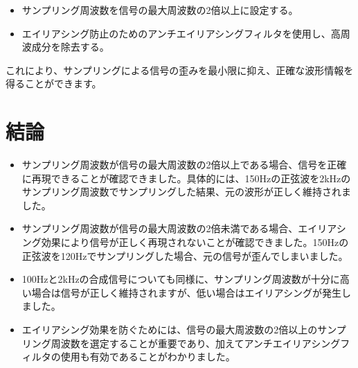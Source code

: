 \documentclass[a4paper,11pt,xelatex,ja=standard]{bxjsarticle}
\begin{document}
        \begin{itemize}
        \item サンプリング周波数を信号の最大周波数の2倍以上に設定する。
        \item エイリアシング防止のためのアンチエイリアシングフィルタを使用し、高周波成分を除去する。
        \end{itemize}

    これにより、サンプリングによる信号の歪みを最小限に抑え、正確な波形情報を得ることができます。

\section{結論}

    \begin{itemize}
        \item サンプリング周波数が信号の最大周波数の2倍以上である場合、信号を正確に再現できることが確認できました。具体的には、150Hzの正弦波を2kHzのサンプリング周波数でサンプリングした結果、元の波形が正しく維持されました。
        \item サンプリング周波数が信号の最大周波数の2倍未満である場合、エイリアシング効果により信号が正しく再現されないことが確認できました。150Hzの正弦波を120Hzでサンプリングした場合、元の信号が歪んでしまいました。
        \item 100Hzと2kHzの合成信号についても同様に、サンプリング周波数が十分に高い場合は信号が正しく維持されますが、低い場合はエイリアシングが発生しました。
        \item エイリアシング効果を防ぐためには、信号の最大周波数の2倍以上のサンプリング周波数を選定することが重要であり、加えてアンチエイリアシングフィルタの使用も有効であることがわかりました。
    \end{itemize}
\end{document}
